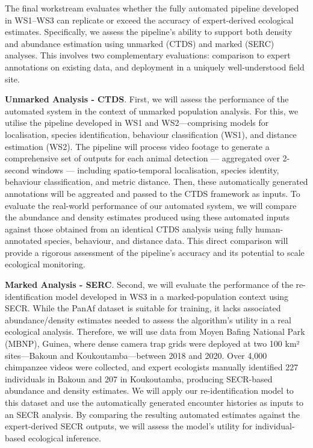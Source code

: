 The final workstream evaluates whether the fully automated pipeline developed in WS1–WS3 can replicate or exceed the accuracy of expert-derived ecological estimates. Specifically, we assess the pipeline’s ability to support both density and abundance estimation using unmarked (CTDS) and marked (SERC) analyses. This involves two complementary evaluations: comparison to expert annotations on existing data, and deployment in a uniquely well-understood field site.


\textbf{Unmarked Analysis - CTDS}. First, we will assess the performance of the automated system in the context of unmarked population analysis. For this, we utilise the pipeline developed in WS1 and WS2—comprising models for localisation, species identification, behaviour classification (WS1), and distance estimation (WS2). The pipeline will process video footage to generate a comprehensive set of outputs for each animal detection — aggregated over 2-second windows — including spatio-temporal localisation, species identity, behaviour classification, and metric distance. Then, these automatically generated annotations will be aggreated and passed to the CTDS framework as inputs. To evaluate the real-world performance of our automated system, we will compare the abundance and density estimates produced using these automated inputs against those obtained from an identical CTDS analysis using fully human-annotated species, behaviour, and distance data. This direct comparison will provide a rigorous assessment of the pipeline’s accuracy and its potential to scale ecological monitoring.


\textbf{Marked Analysis - SERC}. Second, we will evaluate the performance of the re-identification model developed in WS3 in a marked-population context using SECR. While the PanAf dataset is suitable for training, it lacks associated abundance/density estimates needed to assess the algorithm’s utility in a real ecological analysis. Therefore, we will use data from Moyen Bafing National Park (MBNP), Guinea, where dense camera trap grids were deployed at two 100 km² sites—Bakoun and Koukoutamba—between 2018 and 2020. Over 4,000 chimpanzee videos were collected, and expert ecologists manually identified 227 individuals in Bakoun and 207 in Koukoutamba, producing SECR-based abundance and density estimates. We will apply our re-identification model to this dataset and use the automatically generated encounter histories as inputs to an SECR analysis. By comparing the resulting automated estimates against the expert-derived SECR outputs, we will assess the model’s utility for individual-based ecological inference.

